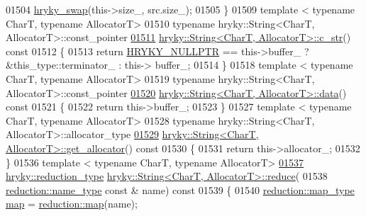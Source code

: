 \begin{DoxyCode}
01504     \hyperlink{namespacehryky_add9c1c1fdfda07cd47bcb7c16d3a823a}{hryky_swap}(this->size\_,        src.size\_);
01505 \}
01509 \textcolor{keyword}{template} < \textcolor{keyword}{typename} CharT, \textcolor{keyword}{typename} AllocatorT>
01510 \textcolor{keyword}{typename} hryky::String<CharT, AllocatorT>::const\_pointer
\hypertarget{string_8h_source_l01511}{}\hyperlink{classhryky_1_1_string_a6cbb3af33227054fa85010603cbfa430}{01511} \hyperlink{classhryky_1_1_string}{hryky::String<CharT, AllocatorT>::c_str}()\textcolor{keyword}{ const}
01512 \textcolor{keyword}{}\{
01513     \textcolor{keywordflow}{return} \hyperlink{common_8h_a4cd4ac09cfcdbd6b30ee69afc156e210}{HRYKY_NULLPTR} == this->buffer\_ ? &this\_type::terminator\_ : this->
      buffer\_;
01514 \}
01518 \textcolor{keyword}{template} < \textcolor{keyword}{typename} CharT, \textcolor{keyword}{typename} AllocatorT>
01519 \textcolor{keyword}{typename} hryky::String<CharT, AllocatorT>::const\_pointer
\hypertarget{string_8h_source_l01520}{}\hyperlink{classhryky_1_1_string_af61f2a74347fabebd76f9fa810341724}{01520} \hyperlink{classhryky_1_1_string}{hryky::String<CharT, AllocatorT>::data}()\textcolor{keyword}{ const}
01521 \textcolor{keyword}{}\{
01522     \textcolor{keywordflow}{return} this->buffer\_;
01523 \}
01527 \textcolor{keyword}{template} < \textcolor{keyword}{typename} CharT, \textcolor{keyword}{typename} AllocatorT>
01528 \textcolor{keyword}{typename} hryky::String<CharT, AllocatorT>::allocator\_type 
\hypertarget{string_8h_source_l01529}{}\hyperlink{classhryky_1_1_string_a710ee15ff97ece02e764e0be568522bc}{01529} \hyperlink{classhryky_1_1_string}{hryky::String<CharT, AllocatorT>::get_allocator}()\textcolor{keyword}{ const}
01530 \textcolor{keyword}{}\{
01531     \textcolor{keywordflow}{return} this->allocator\_;
01532 \}
01536 \textcolor{keyword}{template} < \textcolor{keyword}{typename} CharT, \textcolor{keyword}{typename} AllocatorT>
\hypertarget{string_8h_source_l01537}{}\hyperlink{classhryky_1_1_string_a03adae56f3604b70e4cf17c8473c667a}{01537} \hyperlink{classhryky_1_1_intrusive_ptr}{hryky::reduction_type} \hyperlink{namespacehryky_af41cb3af6766761da0ff21b84527a52c}{hryky::String<CharT, AllocatorT>::reduce}(
01538     \hyperlink{classhryky_1_1reduction_1_1_string}{reduction::name_type} \textcolor{keyword}{const} & name)\textcolor{keyword}{ const}
01539 \textcolor{keyword}{}\{
01540     \hyperlink{classhryky_1_1_intrusive_ptr}{reduction::map_type} \hyperlink{namespacehryky_1_1reduction_ac5eae270cf8047b294dc4ff3e5e11a79}{map} = \hyperlink{namespacehryky_1_1reduction_ac5eae270cf8047b294dc4ff3e5e11a79}{reduction::map}(name);

\end{DoxyCode}
